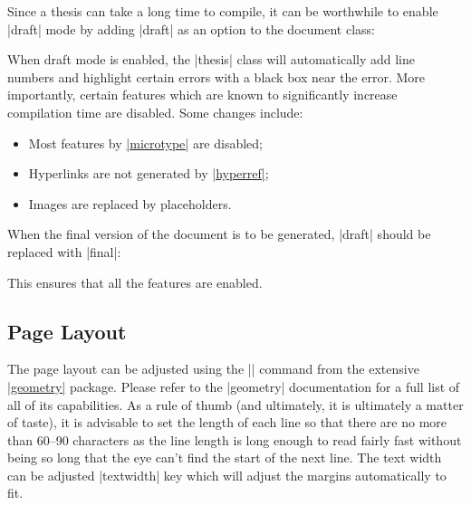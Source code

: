 Since a thesis can take a long time to compile, it can be worthwhile to enable
|draft| mode by adding |draft| as an option to the document class:


When draft mode is enabled, the |thesis| class will automatically add line
numbers and highlight certain errors with a black box near the error.  More
importantly, certain features which are known to significantly increase
compilation time are disabled.  Some changes include:
\begin{itemize}
\item Most features by \href{http://ctan.org/pkg/microtype}{|microtype|} are
  disabled;
\item Hyperlinks are not generated by
  \href{http://ctan.org/pkg/hyperref}{|hyperref|};
\item Images are replaced by placeholders.
\end{itemize}

When the final version of the document is to be generated, |draft| should be
replaced with |final|:


This ensures that all the features are enabled.

\subsection{Page Layout}
\label{subsec:page_layout}

The page layout can be adjusted using the |\geometry| command from the extensive
\href{http://ctan.org/pkg/geometry}{|geometry|} package.  Please refer to the
|geometry| documentation for a full list of all of its capabilities.  As a rule
of thumb (and ultimately, it is ultimately a matter of taste), it is advisable
to set the length of each line so that there are no more than 60--90 characters
as the line length is long enough to read fairly fast without being so long that
the eye can't find the start of the next line.  The text width can be adjusted
|textwidth| key which will adjust the margins automatically to fit.

\begin{codeexample}[execute code=false]
\end{codeexample}


